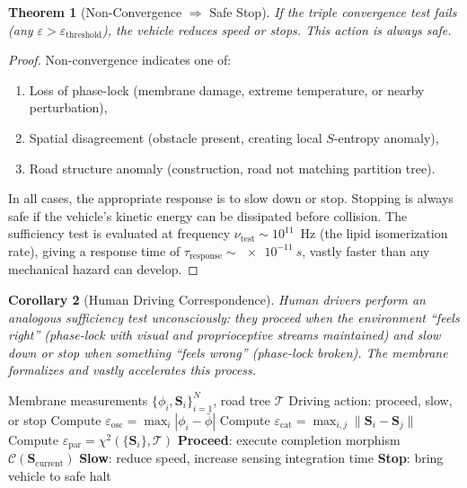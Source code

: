 \documentclass[twocolumn,10pt]{article}
\newtheorem{theorem}{Theorem}[section]
\newtheorem{corollary}[theorem]{Corollary}
\theoremstyle{definition}
\theoremstyle{remark}
\begin{document}
\begin{theorem}[Non-Convergence $\Rightarrow$ Safe Stop]
\label{thm:non_convergence}
If the triple convergence test fails (any $\varepsilon > \varepsilon_{\mathrm{threshold}}$), the vehicle reduces speed or stops. This action is always safe.
\end{theorem}

\begin{proof}
Non-convergence indicates one of:
\begin{enumerate}[label=(\alph*)]
  \item Loss of phase-lock (membrane damage, extreme temperature, or nearby perturbation),
  \item Spatial disagreement (obstacle present, creating local $S$-entropy anomaly),
  \item Road structure anomaly (construction, road not matching partition tree).
\end{enumerate}
In all cases, the appropriate response is to slow down or stop. Stopping is always safe if the vehicle's kinetic energy can be dissipated before collision. The sufficiency test is evaluated at frequency $\nu_{\mathrm{test}} \sim 10^{11}$~Hz (the lipid isomerization rate), giving a response time of $\tau_{\mathrm{response}} \sim \SI{e-11}{s}$, vastly faster than any mechanical hazard can develop.
\end{proof}

\begin{corollary}[Human Driving Correspondence]
\label{cor:human_driving}
Human drivers perform an analogous sufficiency test unconsciously: they proceed when the environment ``feels right'' (phase-lock with visual and proprioceptive streams maintained) and slow down or stop when something ``feels wrong'' (phase-lock broken). The membrane formalizes and vastly accelerates this process.
\end{corollary}

\begin{algorithm}[H]
\caption{Sufficiency Recognition Protocol}
\label{alg:sufficiency}
\begin{algorithmic}[1]
\REQUIRE Membrane measurements $\{\phi_i, \mathbf{S}_i\}_{i=1}^{N}$, road tree $\mathcal{T}$
\ENSURE Driving action: proceed, slow, or stop
\STATE Compute $\varepsilon_{\mathrm{osc}} = \max_i |\phi_i - \bar{\phi}|$
\STATE Compute $\varepsilon_{\mathrm{cat}} = \max_{i,j} \|\mathbf{S}_i - \mathbf{S}_j\|$
\STATE Compute $\varepsilon_{\mathrm{par}} = \chi^2(\{\mathbf{S}_i\}, \mathcal{T})$
  \STATE \textbf{Proceed}: execute completion morphism $\mathcal{C}(\mathbf{S}_{\mathrm{current}})$
  \STATE \textbf{Slow}: reduce speed, increase sensing integration time
\ELSE
  \STATE \textbf{Stop}: bring vehicle to safe halt
\ENDIF
\end{algorithmic}
\end{algorithm}
\end{document}
